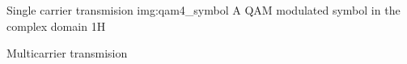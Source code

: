 \begin{subchapter}{Single carrier transmision}
               {img:qam4_symbol}
               {A QAM modulated symbol in the complex domain}
               {1}{H}
\end{subchapter}

\begin{subchapter}{Multicarrier transmision}

\end{subchapter}
